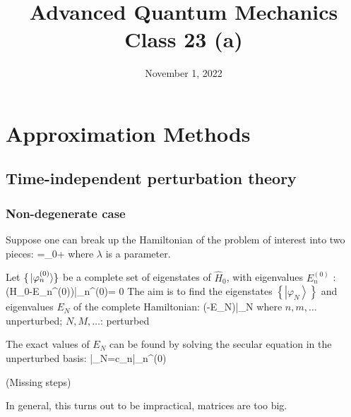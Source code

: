 \documentclass[12pt]{article}
\title{Advanced Quantum Mechanics\\Class 23 (a)}
\date{November 1, 2022}                                           %
\begin{document}
\maketitle

\section{Approximation Methods}

\subsection{Time-independent perturbation theory}

\subsubsection{Non-degenerate case}

Suppose one can break up the Hamiltonian of the
problem of interest into two pieces:
\be
{}=_{0}+\lambda {}
\ee
where $\lambda$ is a parameter.


Let $\{\ket*{\varphi_{n}^{(0)}}\}$ be a complete set of eigenstates of $\hat{H}_{0}$,
with eigenvalues $E_{n}^{(0)}$ :
\be
\left(H_{0}-E_{n}^{(0)}\right)\left|\varphi_{n}^{(0)}\right\rangle= 0
\ee
The aim is to find the eigenstates $\left\{\left|\varphi_{N}\right\rangle\right\}$ and eigenvalues
$E_{N}$ of the complete Hamiltonian:
\be
\left(-E_{N}\right)\left|\varphi_{N}\right{}
\label{eq:g3}
\ee
where $n,m,\ldots$ unperturbed; $N,M,\ldots$: perturbed

The exact values of $E_{N}$ can be found by solving
the secular equation in the unperturbed basis:
\be
\left|\varphi_{N}\right\rangle=\sum c_{n}\left|\varphi_{n}^{(0)}\right\rangle
\ee

(Missing steps)
\setcounter{equation}{6}

\be
{}
\ee
In general, this turns out to be impractical, matrices are too big.

\end{document}
